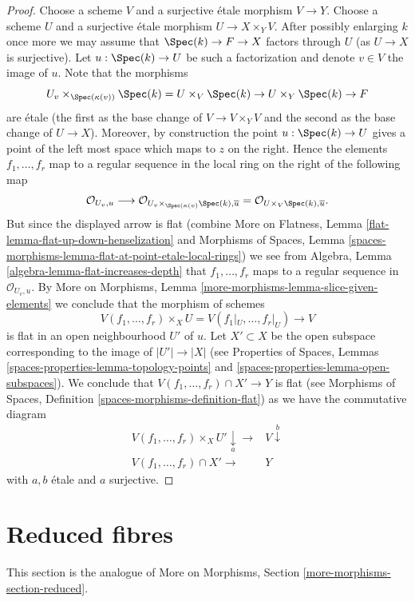 \begin{proof}
\medskip\noindent
Choose a scheme $V$ and a surjective \'etale morphism
$V \to Y$. Choose a scheme $U$ and a surjective \'etale morphism
$U \to X \times_Y V$. After possibly enlarging $k$ once more we may
assume that $\Spec(k) \to F \to X$ factors through $U$ (as
$U \to X$ is surjective). Let
$u : \Spec(k) \to U$ be such a factorization and denote $v \in V$
the image of $u$. Note that the morphisms
$$
U_v \times_{\Spec(\kappa(v))} \Spec(k) =
U \times_V \Spec(k) \to U \times_Y \Spec(k) \to F
$$
are \'etale (the first as the base change of $V \to V \times_Y V$ and
the second as the base change of $U \to X$). Moreover, by construction
the point $u : \Spec(k) \to U$ gives a point of the left most
space which maps to $z$ on the right. Hence the elements
$f_1, \ldots, f_r$ map to a regular sequence in the local ring
on the right of the following map
$$
\mathcal{O}_{U_v, u}
\longrightarrow
\mathcal{O}_{U_v \times_{\Spec(\kappa(v)} \Spec(k), \overline{u}}
=
\mathcal{O}_{U \times_V \Spec(k), \overline{u}}.
$$
But since the displayed arrow is flat (combine
More on Flatness, Lemma \ref{flat-lemma-flat-up-down-henselization}
and
Morphisms of Spaces,
Lemma \ref{spaces-morphisms-lemma-flat-at-point-etale-local-rings})
we see from
Algebra, Lemma \ref{algebra-lemma-flat-increases-depth}
that $f_1, \ldots, f_r$ maps to a regular sequence in
$\mathcal{O}_{U_v, u}$. By
More on Morphisms, Lemma \ref{more-morphisms-lemma-slice-given-elements}
we conclude that the morphism of schemes
$$
V(f_1, \ldots, f_r) \times_X U = V(f_1|_U, \ldots, f_r|_U) \to V
$$
is flat in an open neighbourhood $U'$ of $u$. Let $X' \subset X$
be the open subspace corresponding to the image of
$|U'| \to |X|$ (see
Properties of Spaces, Lemmas
\ref{spaces-properties-lemma-topology-points} and
\ref{spaces-properties-lemma-open-subspaces}).
We conclude that $V(f_1, \ldots, f_r) \cap X' \to Y$ is flat
(see
Morphisms of Spaces, Definition \ref{spaces-morphisms-definition-flat})
as
we have the commutative diagram
$$
\begin{array}{cc}V(f_1, \ldots, f_r) \times_X U' \underset{a}{\downarrow}\longrightarrow & V \overset{b}{\downarrow} \\ V(f_1, \ldots, f_r) \cap X' \longrightarrow & Y\end{array}
$$
with $a, b$ \'etale and $a$ surjective.
\end{proof}

\section{Reduced fibres}
\label{spaces-more-morphisms-section-reduced}
This section is the analogue of
More on Morphisms, Section \ref{more-morphisms-section-reduced}.

